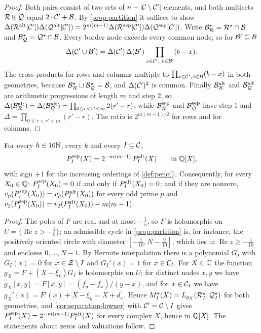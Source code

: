 \begin{proof}
Both pairs consist of two sets of $n-\lvert \mathcal{C}\setminus\mathcal{C}'\rvert$ elements, and both multisets
$\mathcal{R}\uplus\mathcal{Q}$ equal $2\cdot\mathcal{C}'+\mathcal{B}$. By \cref{prop:partition} it suffices to show
$\Delta(\mathcal{R}^{\mathrm{alt}}[\mathcal{C}'])\Delta(\mathcal{Q}^{\mathrm{alt}}[\mathcal{C}'])
=2^{m(m-1)}\Delta(\mathcal{R}^{\mathrm{sep}}[\mathcal{C}'])\Delta(\mathcal{Q}^{\mathrm{sep}}[\mathcal{C}'])$. Write
$\mathcal{B}^\star_{\mathcal{R}}=\mathcal{R}^\star\cap\mathcal{B}$ and $\mathcal{B}^\star_{\mathcal{Q}}=\mathcal{Q}^\star\cap\mathcal{B}$. Every border node
exceeds every common node, so for $\mathcal{B}'\subseteq\mathcal{B}$
\[
  \Delta(\Com'\cup\Bor')=\Delta(\Com')\,\Delta(\Bor')\prod_{x\in\Com',\ b\in\Bor'}(b-x).
\]
The cross products for rows and columns multiply to $\prod_{x\in\mathcal{C}',\,b\in\mathcal{B}}(b-x)$ in both
geometries, because $\mathcal{B}^\star_{\mathcal{R}}\sqcup\mathcal{B}^\star_{\mathcal{Q}}=\mathcal{B}$, and $\Delta(\mathcal{C}')^2$ is common.
Finally $\mathcal{B}^{\mathrm{alt}}_{\mathcal{R}}$ and $\mathcal{B}^{\mathrm{alt}}_{\mathcal{Q}}$ are arithmetic progressions of length $m$ and step
$2$, so $\Delta(\mathcal{B}^{\mathrm{alt}}_{\mathcal{R}})=\Delta(\mathcal{B}^{\mathrm{alt}}_{\mathcal{Q}})=\prod_{0\le r<r'<m}2(r'-r)$, while
$\mathcal{B}^{\mathrm{sep}}_{\mathcal{R}}$ and $\mathcal{B}^{\mathrm{sep}}_{\mathcal{Q}}$ have step $1$ and $\Delta=\prod_{0\le r<r'<m}(r'-r)$. The
ratio is $2^{m(m-1)/2}$ for rows and for columns.
\end{proof}

\begin{corollary}\label{cor:separation}
For every $h\in16\mathbb{N}$, every $k$ and every $I\subseteq\mathcal{C}$,
\[
  P^{\mathrm{sep}}_I(X)=2^{-m(m-1)}\,P^{\mathrm{alt}}_I(X)\qquad\text{in }\mathbb{Q}[X],
\]
with sign $+1$ for the increasing orderings of \cref{def:pencil}. Consequently, for every
$X_0\in\mathbb{Q}$: $P^{\mathrm{sep}}_I(X_0)=0$ if and only if $P^{\mathrm{alt}}_I(X_0)=0$; and if they are nonzero,
$v_p(P^{\mathrm{sep}}_I(X_0))=v_p(P^{\mathrm{alt}}_I(X_0))$ for every odd prime $p$ and
$v_2(P^{\mathrm{sep}}_I(X_0))=v_2(P^{\mathrm{alt}}_I(X_0))-m(m-1)$.
\end{corollary}

\begin{proof}
The poles of $F$ are real and at most $-\frac15$, so $F$ is holomorphic on
$U=\{\operatorname{Re}z>-\frac15\}$; an admissible cycle in \cref{prop:partition} is, for
instance, the positively oriented circle with diameter $[-\frac1{10},N-\frac9{10}]$, which lies in
$\operatorname{Re}z\ge-\frac1{10}$ and encloses $0,\dots,N-1$. By Hermite interpolation there is a
polynomial $G_I$ with $G_I(x)=0$ for $x\in\mathcal{Z}\setminus I$ and $G_I'(x)=1$ for $x\in\mathcal{C}_I$. For
$X\in\mathbb{C}$ the function $g_X=F+(X-\xi_k)G_I$ is holomorphic on $U$; for distinct nodes $x,y$ we have
$g_X[x,y]=F[x,y]=(f_y-f_x)/(y-x)$, and for $x\in\mathcal{C}_I$ we have
$g_X'(x)=F'(x)+X-\xi_k=X+d_x$. Hence $M^\star_I(X)=L_{g_X}(\mathcal{R}^\star_I,\mathcal{Q}^\star_I)$ for both
geometries, and \cref{cor:separation-lowner} with $\mathcal{C}'=\mathcal{C}\setminus I$ gives
$P^{\mathrm{sep}}_I(X)=2^{-m(m-1)}P^{\mathrm{alt}}_I(X)$ for every complex $X$, hence in $\mathbb{Q}[X]$. The statements
about zeros and valuations follow.
\end{proof}

